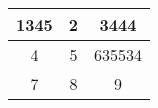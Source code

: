 \begin{table}
\begin{tabular}{|c|c|c|}
\hline
  1345  &   2    &  3444  \\ \hline
   4    &   5    & 635534 \\ \hline
   7    &   8    &   9    \\ \hline
\end{tabular}
\end{table}
